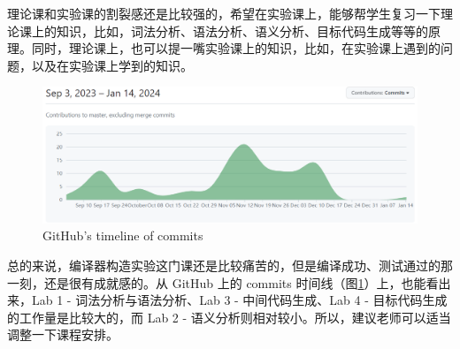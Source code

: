 \documentclass{article}
\begin{document}
理论课和实验课的割裂感还是比较强的，希望在实验课上，能够帮学生复习一下理论课上的知识，比如，词法分析、语法分析、语义分析、目标代码生成等等的原理。同时，理论课上，也可以提一嘴实验课上的知识，比如，在实验课上遇到的问题，以及在实验课上学到的知识。

\begin{figure}[h]
    \centering
    \includegraphics[width=1\textwidth]{pic/timeline.png}
    \caption{GitHub's timeline of commits}
    \label{fig:timeline}
\end{figure}

总的来说，编译器构造实验这门课还是比较痛苦的，但是编译成功、测试通过的那一刻，还是很有成就感的。从 GitHub 上的 commits 时间线（图\ref{fig:timeline}）上，也能看出来，Lab 1 - 词法分析与语法分析、Lab 3 - 中间代码生成、Lab 4 - 目标代码生成的工作量是比较大的，而 Lab 2 - 语义分析则相对较小。所以，建议老师可以适当调整一下课程安排。
\end{document}
